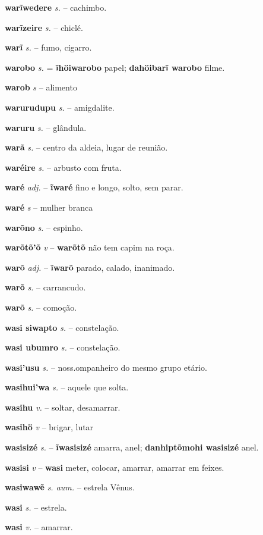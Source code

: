 \textbf{warĩwedere} \textit{s.} -- cachimbo.

\textbf{warĩzeire} \textit{s.} -- chiclé.

\textbf{warĩ} \textit{s.} -- fumo, cigarro.

\textbf{warobo} \textit{s.} = \textbf{ĩhöiwarobo} papel; \textbf{dahöibarĩ warobo} filme.

\textbf{warob} \textit{s} -- {alimento}

\textbf{warurudupu} \textit{s.} -- amigdalite.

\textbf{waruru} \textit{s.} -- glândula.

\textbf{warã} \textit{s.} -- centro da aldeia, lugar de reunião.

\textbf{waréire} \textit{s.} -- arbusto com fruta.

\textbf{waré} \textit{adj.} -- \textbf{ĩwaré} fino e longo, solto, sem parar.

\textbf{waré} \textit{s} -- {mulher branca}

\textbf{warõno} \textit{s.} -- espinho.

\textbf{warõtõ'õ} \textit{v} -- \textbf{warõtõ} não tem capim na roça.

\textbf{warõ} \textit{adj.} -- \textbf{ĩwarõ} parado, calado, inanimado.

\textbf{warõ} \textit{s.} -- carrancudo.

\textbf{warõ} \textit{s.} -- comoção.

\textbf{wasi siwapto} \textit{s.} -- constelação.

\textbf{wasi ubumro} \textit{s.} -- constelação.

\textbf{wasi'usu} \textit{s.} -- noss.ompanheiro do mesmo grupo etário.

\textbf{wasihui'wa} \textit{s.} -- aquele que solta.

\textbf{wasihu} \textit{v.} -- soltar, desamarrar.

\textbf{wasihö} \textit{v} -- {brigar, lutar}

\textbf{wasisizé} \textit{s.} -- \textbf{ĩwasisizé} amarra, anel; \textbf{danhiptõmohi wasisizé} anel.

\textbf{wasisi} \textit{v} -- \textbf{wasi} meter, colocar, amarrar, amarrar em feixes.

\textbf{wasiwawẽ} \textit{s. aum.} -- estrela Vênus.

\textbf{wasi} \textit{s.} -- estrela.

\textbf{wasi} \textit{v.} -- amarrar.

